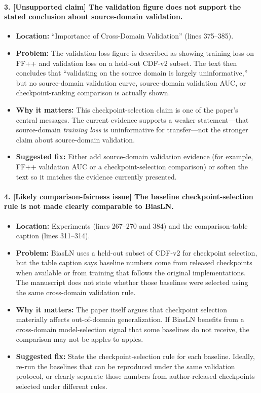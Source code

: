 \documentclass[11pt]{article}
\begin{document}
\paragraph{3. [Unsupported claim] The validation figure does not support the stated conclusion about source-domain validation.}
\begin{itemize}
    \item \textbf{Location:} ``Importance of Cross-Domain Validation'' (lines 375--385).
    \item \textbf{Problem:} The validation-loss figure is described as showing training loss on FF++ and validation loss on a held-out CDF-v2 subset. The text then concludes that ``validating on the source domain is largely uninformative,'' but no source-domain validation curve, source-domain validation AUC, or checkpoint-ranking comparison is actually shown.
    \item \textbf{Why it matters:} This checkpoint-selection claim is one of the paper's central messages. The current evidence supports a weaker statement---that source-domain \emph{training loss} is uninformative for transfer---not the stronger claim about source-domain validation.
    \item \textbf{Suggested fix:} Either add source-domain validation evidence (for example, FF++ validation AUC or a checkpoint-selection comparison) or soften the text so it matches the evidence currently presented.
\end{itemize}

\paragraph{4. [Likely comparison-fairness issue] The baseline checkpoint-selection rule is not made clearly comparable to BiasLN.}
\begin{itemize}
    \item \textbf{Location:} Experiments (lines 267--270 and 384) and the comparison-table caption (lines 311--314).
    \item \textbf{Problem:} BiasLN uses a held-out subset of CDF-v2 for checkpoint selection, but the table caption says baseline numbers come from released checkpoints when available or from training that follows the original implementations. The manuscript does not state whether those baselines were selected using the same cross-domain validation rule.
    \item \textbf{Why it matters:} The paper itself argues that checkpoint selection materially affects out-of-domain generalization. If BiasLN benefits from a cross-domain model-selection signal that some baselines do not receive, the comparison may not be apples-to-apples.
    \item \textbf{Suggested fix:} State the checkpoint-selection rule for each baseline. Ideally, re-run the baselines that can be reproduced under the same validation protocol, or clearly separate those numbers from author-released checkpoints selected under different rules.
\end{itemize}
\end{document}
